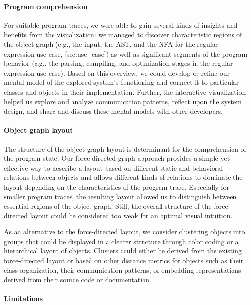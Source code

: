 \paragraph{Program comprehension}

For suitable program traces, we were able to gain several kinds of insights and benefits from the visualization:
we managed to discover characteristic regions of the object graph (e.g., the input, the AST, and the NFA for the regular expression use case, \cref{sec:use_case}) as well as significant segments of the program behavior (e.g., the parsing, compiling, and optimization stages in the regular expression use case).
Based on this overview, we could develop or refine our mental model of the explored system's functioning and connect it to particular classes and objects in their implementation.
Further, the interactive visualization helped us explore and analyze communication patterns, reflect upon the system design, and share and discuss these mental models with other developers.

\paragraph{Object graph layout}

The structure of the object graph layout is determinant for the comprehension of the program state.
Our force-directed graph approach provides a simple yet effective way to describe a layout based on different static and behavioral relations between objects and allows different kinds of relations to dominate the layout depending on the characteristics of the program trace.
Especially for smaller program traces, the resulting layout allowed us to distinguish between essential regions of the object graph.
Still, the overall structure of the force-directed layout could be considered too weak for an optimal visual intuition.

As an alternative to the force-directed layout, we consider clustering objects into groups that could be displayed in a clearer structure through color coding or a hierarchical layout of objects.
Clusters could either be derived from the existing force-directed layout or based on other distance metrics for objects such as their class organization, their communication patterns, or embedding representations derived from their source code or documentation.

\paragraph{Limitations}

